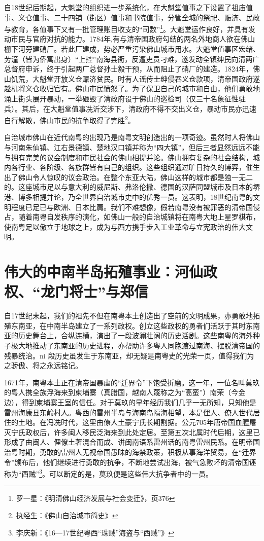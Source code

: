 自18世纪后期起，大魁堂的组织进一步系统化，在大魁堂值事之下设置了祖庙值事、义仓值事、二十四铺（街区）值事和书院值事，分管全城的祭祀、赈济、民政与教育，各值事下又有一批管理账目收支的“司数”\footnote{罗一星：《明清佛山经济发展与社会变迁》，页376}。大魁堂运作良好，并具有发动市民与官府对抗的能力。1784年,有与清帝国政府勾结的两名外地商人欲在佛山栅下河旁建硝厂。若此厂建成，势必严重污染佛山城市用水。大魁堂值事区宏绪、劳潼（皆为侨寓出身）“上控”南海县衙，反遭吏员刁难，遂发动全镇绅民向清两广总督府申诉，终于引起两广总督孙士毅干预，从而阻止了硝厂的建造。1824年，佛山饥荒，大魁堂开放义仓赈济贫民。时有人谣传士绅侵吞义仓款项，清帝国政府遂趁机将义仓收归官有。佛山市民愤怒了。为了保卫自己的城市和自由，他们勇敢地涌上街头展开暴动，一举砸毁了清政府设于佛山的巡检司（仅三十名象征性驻兵）。其后，在大魁堂值事冼沂交涉下，清政府不得不交出义仓，暴动市民亦迅速自行解散，佛山市民的抗争取得了完胜\footnote{执经生：《佛山自治城市简史》}。

自治城市佛山在近代南粤的出现乃是南粤文明创造出的一项奇迹。虽然时人将佛山与河南朱仙镇、江右景德镇、楚地汉口镇并称为“四大镇”，但后三者显然远远不能与拥有完美的议会制度和市民社会的佛山相提并论。佛山拥有复杂的社会结构，城内各行业、各阶级、各族群皆有自己的组织。这些组织通过旷日持久的博弈，催生出了佛山令人惊叹的议会政治。在整个东亚大陆，佛山这样的城市都是独一无二的。这座城市足以与意大利的威尼斯、弗洛伦撒、德国的汉萨同盟城市及日本的堺港、博多相提并论，乃全世界自治城市史中的优秀一员。这表明，18世纪南粤的文明程度已足已与欧洲、日本比肩。我们不难想像，假若南粤没有被罪恶的清帝国侵占，随着南粤自发秩序的演化，如佛山一般的自治城镇将在南粤大地上星罗棋布，使南粤足以傲立于地球之上，成为与西方携手步入工业革命与立宪政治的伟大文明。

\section{伟大的中南半岛拓殖事业：河仙政权、“龙门将士”与郑信}

自17世纪末起，我们的祖先不但在南粤本土创造出了空前的文明成果，亦勇敢地拓殖东南亚，在中南半岛建立了一系列政权。创立这些政权的勇者们活跃于其时东南亚的历史舞台上，合纵连横，演出了一段波澜壮阔的历史活剧。这些南粤的海外种子极大地推动了东南亚的历史进程，亦帮助许多粤人同胞渡过南海、摆脱清帝国的残暴统治。ni 段历史虽发生于东南亚，却无疑是南粤史的光荣一页，值得我们为之骄傲、将之永远铭记。

1671年，南粤本土正在清帝国暴虐的“迁界令”下饱受折磨。这一年，一位名叫莫玖的粤人携全族浮海来到柬埔寨（真腊国，越南人蔑称之为“高蛮”）南荣（今金边），得到柬埔寨王室的信任。对于莫玖的早年经历我们几乎一无所知，只知他是雷州海康县东岭村人。粤西的雷州半岛与海南岛隔海相望，本是俚人、僚人世代居住的土地。在冯冼时代，这里由僚人土豪宁氏长期割据。公元705年唐帝国血腥屠灭宁氏政权后，许多闽人移民泛海来到此处定居。至第五次北属时代后期，这里已形成了由闽人、俚僚土著混合而成、讲闽南语系雷州话的南粤雷州民系。在明帝国治粤时期，勇敢的雷州人无视帝国愚昧的海禁政策，积极从事海洋贸易，在“迁界令”颁布后，他们继续进行勇敢的抗争，不断地尝试出海，被气急败坏的清帝国诬称为“西贼”\footnote{李庆新：《16—17世纪粤西“珠贼”海盗与“西贼”》}。可以断定的是，莫玖便是这些伟大抗争者中的一员。

